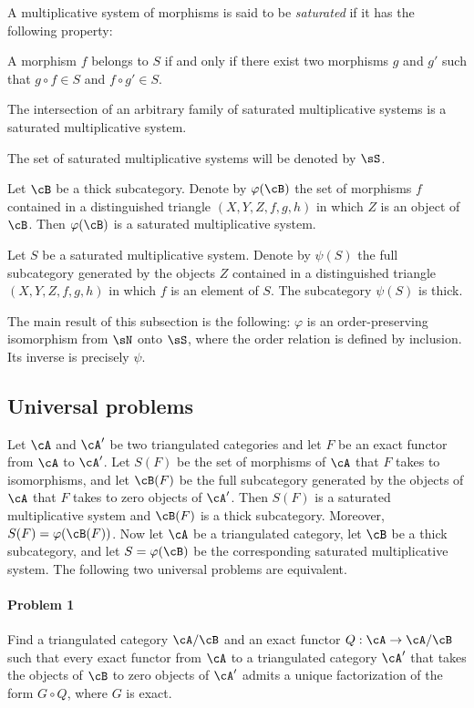 A multiplicative system of morphisms is said to be \emph{saturated} if it
has the following property:

A morphism $f$ belongs to $S$ if and only if there exist two morphisms $g$
and $g'$ such that $g\circ f\in S$ and $f\circ g'\in S$.

The intersection of an arbitrary family of saturated multiplicative
systems is a saturated multiplicative system.

The set of saturated multiplicative systems will be denoted by $\sS$.

Let $\cB$ be a thick subcategory. Denote by $\varphi(\cB)$ the set of
morphisms $f$ contained in a distinguished triangle $(X,Y,Z,f,g,h)$ in
which $Z$ is an object of $\cB$. Then $\varphi(\cB)$ is a saturated
multiplicative system.

Let $S$ be a saturated multiplicative system. Denote by $\psi(S)$ the
full subcategory generated by the objects $Z$ contained in a distinguished
triangle $(X,Y,Z,f,g,h)$ in which $f$ is an element of $S$. The
subcategory $\psi(S)$ is thick.

The main result of this subsection is the following: $\varphi$ is an
order-preserving isomorphism from $\sN$ onto $\sS$, where the order
relation is defined by inclusion. Its inverse is precisely $\psi$.

\subsection{Universal problems}\label{VIII:2-2}

Let $\cA$ and $\cA'$ be two triangulated categories and let $F$ be an exact
functor from $\cA$ to $\cA'$. Let $S(F)$ be the set of morphisms of $\cA$
that $F$ takes to isomorphisms, and let $\cB(F)$ be the full subcategory
generated by the objects of $\cA$ that $F$ takes to zero objects of
$\cA'$. Then $S(F)$ is a saturated multiplicative system and $\cB(F)$ is
a thick subcategory. Moreover, $S(F) = \varphi(\cB(F))$. Now let $\cA$ be
a triangulated category, let $\cB$ be a thick subcategory, and let
$S=\varphi(\cB)$ be the corresponding saturated multiplicative system.
The following two universal problems are equivalent.

\paragraph{Problem 1}
\hypertarget{VIII:prob1}{}
Find a triangulated category $\cA/\cB$ and an exact functor
$Q:\cA\to \cA/\cB$ such that every exact functor from $\cA$ to a
triangulated category $\cA'$ that takes the objects of $\cB$ to zero
objects of $\cA'$ admits a unique factorization of the form $G\circ Q$,
where $G$ is exact.

